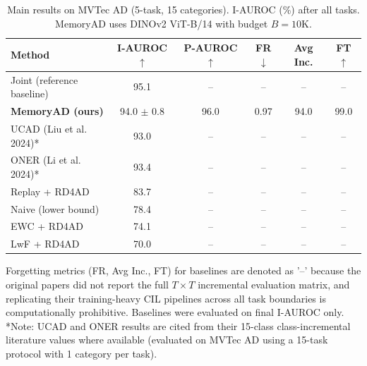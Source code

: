 \begin{table}[htbp]
\centering
\caption{Main results on MVTec AD (5-task, 15 categories). I-AUROC (\%) after all tasks. MemoryAD uses DINOv2 ViT-B/14 with budget $B=10\text{K}$.}
\label{tab:main_results}
\begin{tabular}{lccccc}
\toprule
Method & I-AUROC $\uparrow$ & P-AUROC $\uparrow$ & FR $\downarrow$ & Avg Inc. & FT $\uparrow$ \\
\midrule
Joint (reference baseline) & 95.1 & -- & -- & -- & -- \\
\textbf{MemoryAD (ours)} & 94.0 $\pm$ 0.8 & 96.0 & 0.97 & 94.0 & 99.0 \\
UCAD (Liu et al. 2024)* & 93.0 & -- & -- & -- & -- \\
ONER (Li et al. 2024)* & 93.4 & -- & -- & -- & -- \\
Replay + RD4AD & 83.7 & -- & -- & -- & -- \\
Naive (lower bound) & 78.4 & -- & -- & -- & -- \\
EWC + RD4AD & 74.1 & -- & -- & -- & -- \\
LwF + RD4AD & 70.0 & -- & -- & -- & -- \\
\bottomrule
\end{tabular}
\vspace{1mm}
\footnotesize{Forgetting metrics (FR, Avg Inc., FT) for baselines are denoted as '--' because the original papers did not report the full $T \times T$ incremental evaluation matrix, and replicating their training-heavy CIL pipelines across all task boundaries is computationally prohibitive. Baselines were evaluated on final I-AUROC only. *Note: UCAD and ONER results are cited from their 15-class class-incremental literature values where available (evaluated on MVTec AD using a 15-task protocol with 1 category per task).}
\end{table}